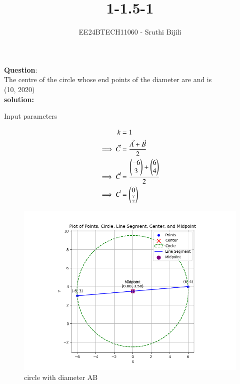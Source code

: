 \documentclass[journal]{IEEEtran}
\begin{document}

\vspace{3cm}

\title{1-1.5-1}
\author{EE24BTECH11060 - Sruthi Bijili}
{\let\newpage\relax\maketitle}

\renewcommand{\thefigure}{\theenumi}
\renewcommand{\thetable}{\theenumi}
\setlength{\intextsep}{10pt} %


\renewcommand{\thetable}{\theenumi}

\textbf{Question}:\\
The centre of the circle whose end points of the diameter are  and  is \\


\hfill(10, 2020)
\\
\textbf{solution:}
\begin{table}[h!]    
  \centering
  
  \caption{Input parameters}
\end{table}
\begin{align}
k&=1\\
\implies \Vec{C}&=\frac{\Vec{A}+\Vec{B}}{2}\\
\implies \Vec{C}&=\frac{\begin{pmatrix}-6 \\ 3\end{pmatrix}+\begin{pmatrix}6 \\ 4\end{pmatrix}}{2}\\
\implies \Vec{C}&=\begin{pmatrix}0 \\ \frac{7}{2}\end{pmatrix}
\end{align}
\begin{figure}[h!]
   \centering
   \includegraphics[width=0.7\linewidth]{figs/fig1.png}
   \caption{circle with diameter AB}
\end{figure}


    
\end{document}
